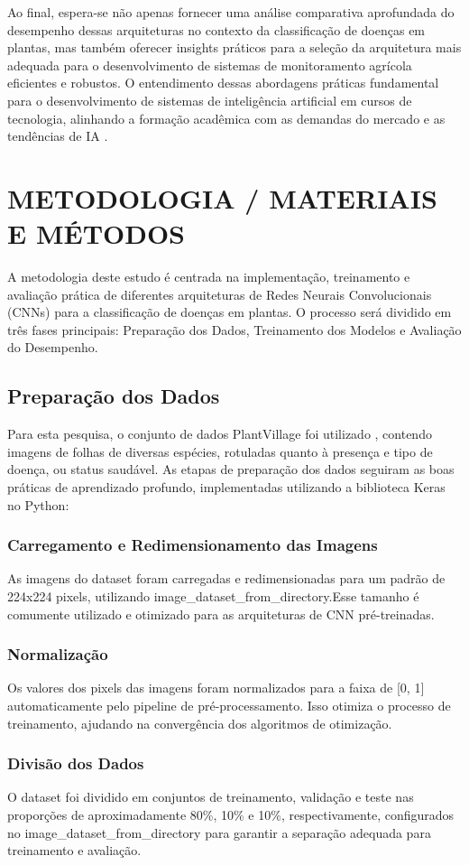 \documentclass[10pt,conference]{IEEEtran}
\begin{document}
Ao final, espera-se não apenas fornecer uma análise comparativa aprofundada do desempenho dessas arquiteturas no contexto da classificação de doenças em plantas, mas também oferecer insights práticos para a seleção da arquitetura mais adequada para o desenvolvimento de sistemas de monitoramento agrícola eficientes e robustos. O entendimento dessas abordagens práticas fundamental para o desenvolvimento de sistemas de inteligência artificial em cursos de tecnologia, alinhando a formação acadêmica com as demandas do mercado e as tendências de IA \cite{vicari2021influencias}.

\section{METODOLOGIA / MATERIAIS E MÉTODOS} 
A metodologia deste estudo é centrada na implementação, treinamento e avaliação prática de diferentes arquiteturas de Redes Neurais Convolucionais (CNNs) para a classificação de doenças em plantas. O processo será dividido em três fases principais: Preparação dos Dados, Treinamento dos Modelos e Avaliação do Desempenho. 
\subsection{Preparação dos Dados}
Para esta pesquisa, o conjunto de dados PlantVillage foi utilizado \cite{hughes2015open}, contendo imagens de folhas de diversas espécies, rotuladas quanto à presença e tipo de doença, ou status saudável. As etapas de preparação dos dados seguiram as boas práticas de aprendizado profundo, implementadas utilizando a biblioteca Keras no Python: 
\subsubsection*{Carregamento e Redimensionamento das Imagens}
As imagens do dataset foram carregadas e redimensionadas para um padrão de 224x224 pixels, utilizando image\_dataset\_from\_directory.Esse tamanho é comumente utilizado e otimizado para as arquiteturas de CNN pré-treinadas. 
\subsubsection*{Normalização}
Os valores dos pixels das imagens foram normalizados para a faixa de [0, 1] automaticamente pelo pipeline de pré-processamento. Isso otimiza o processo de treinamento, ajudando na convergência dos algoritmos de otimização. 
\subsubsection*{Divisão dos Dados}
O dataset foi dividido em conjuntos de treinamento, validação e teste nas proporções de aproximadamente 80\%, 10\% e 10\%, respectivamente, configurados no image\_dataset\_from\_directory para garantir a separação adequada para treinamento e avaliação. 
\end{document}
